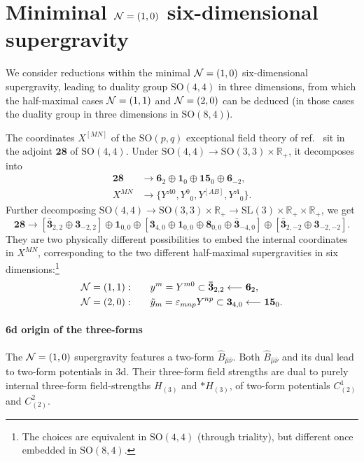 \documentclass[11pt]{article}
\newcommand{\SO}{\ensuremath{\mathrm{SO}}\xspace}
\newcommand{\SL}{\ensuremath{\mathrm{SL}}\xspace}
\newcommand{\R}{\ensuremath{\mathbb{R}}\xspace}
\begin{document}
\section{Miniminal ${\cal N}=(1,0)$ six-dimensional supergravity}
We consider reductions within the minimal ${\cal N}=(1,0)$ six-dimensional supergravity, leading to duality group $\SO(4,4)$ in three dimensions, from which the half-maximal cases ${\cal N}=(1,1)$ and ${\cal N}=(2,0)$ can be deduced (in those cases the duality group in three dimensions in $\SO(8,4)$).

The coordinates $X^{[MN]}$ of the $\SO(p,q)$ exceptional field theory of ref.~\cite{Hohm:2017wtr} sit in the adjoint $\bm{28}$ of $\SO(4,4)$. Under $\SO(4,4)\rightarrow\SO(3,3)\times\R_{+}$, it decomposes into
\begin{equation}  
  \begin{aligned}
    \bm{28} &\longrightarrow \bm{6}_{2} \oplus \bm{1}_{0} \oplus \bm{15}_{0} \oplus \bm{6}_{-2},\\
    X^{MN} &\longrightarrow \{Y^{A0},Y^{0}{}_{0},Y^{[AB]},Y^{A}{}_{0}\}.
  \end{aligned}
\end{equation}
Further decomposing $\SO(4,4)\rightarrow\SO(3,3)\times\R_{+}\rightarrow\SL(3)\times\R_{+}\times\R_{+}$, we get
\begin{equation}  \label{eq:decomp28SO8}
  \bm{28} \longrightarrow \left[\bm{\bar{3}}_{2,2} \oplus \bm{3}_{-2,2}\right] \oplus \bm{1}_{0,0} \oplus \left[\bm{3}_{4,0} \oplus \bm{1}_{0,0} \oplus \bm{8}_{0,0} \oplus \bm{\bar{3}}_{-4,0}\right] \oplus \left[\bm{\bar{3}}_{2,-2} \oplus \bm{3}_{-2,-2}\right].
\end{equation}
They are two physically different possibilities to embed the internal coordinates in $X^{MN}$, corresponding to the two different half-maximal supergravities in six dimensions:\footnote{The choices are equivalent in $\SO(4,4)$ (through triality), but different once embedded in $\SO(8,4)$.}
\begin{equation}  \label{eq:coordSO8}
  \begin{aligned}
    {\cal N}=(1,1):&\qquad y^{m}=Y^{m0}\subset\bm{\bar{3}}_{2,2} \longleftarrow \bm{6}_{2},\\
    {\cal N}=(2,0):&\qquad \tilde{y}_{m}=\varepsilon_{mnp}Y^{np}\subset\bm{3}_{4,0}\longleftarrow\bm{15}_{0}.
  \end{aligned}
\end{equation}

\paragraph{6d origin of the three-forms} The ${\cal N}=(1,0)$ supergravity features a two-form $\hat{B}_{\hat\mu\hat\nu}$. Both $\hat{B}_{\hat\mu\hat\nu}$ and its dual lead to two-form potentials in 3d. Their three-form field strengths are dual to purely internal three-form field-strengths $H_{(3)}$ and $*H_{(3)}$, of two-form potentials $C_{(2)}^{1}$ and $C_{(2)}^{2}$.
\end{document}

